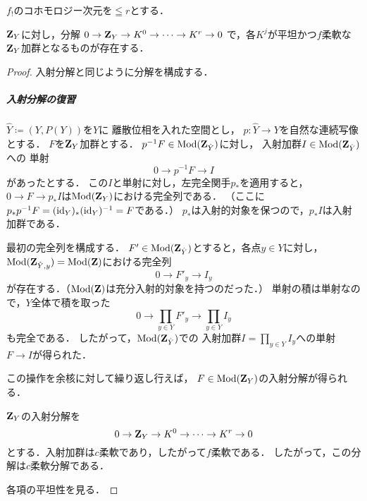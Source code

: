 \(f_!\)のコホモロジー次元を\(\leqq r\)とする．

\begin{LMM}
    \(\mathbf{Z}_Y\)に対し，分解
    \(0\to \mathbf{Z}_Y\to K^0\to\dots\to K^r\to0\)
    で，各\(K^j\)が平坦かつ\(f\)柔軟な\(\mathbf{Z}_Y\)加群となるものが存在する．
\end{LMM}
\begin{proof}
    入射分解と同じように分解を構成する．

    \subparagraph*{入射分解の復習}
    \(\hat{Y}\coloneqq\left(Y,P(Y)\right)\)を\(Y\)に
    離散位相を入れた空間とし，
    \(p\colon \hat{Y}\to Y\)を自然な連続写像とする．
    \(F\)を\(\mathbf{Z}_Y\)加群とする．
    \(p^{-1}F \in\mathop{\mathrm{Mod}}\nolimits(\mathbf{Z}_{\hat{Y}})\)に対し，
    入射加群\(I\in\mathop{\mathrm{Mod}}\nolimits(\mathbf{Z}_{\hat{Y}})\)への
    単射\[0\to p^{-1}F\to I\]があったとする．
    この\(I\)と単射に対し，左完全関手\(p_\ast\)を適用すると，
    \(0\to F\to p_\ast{I}\)は\(\mathop{\mathrm{Mod}}\nolimits(\mathbf{Z}_Y)\)における完全列である．
    （ここに\(p_\ast p^{-1}F=(\mathop{\mathrm{id}}\nolimits_Y)_\ast(\mathop{\mathrm{id}}\nolimits_Y)^{-1}=F\)である．）
    \(p_{\ast}\)は入射的対象を保つので，\(p_\ast{I}\)は入射加群である．

    最初の完全列を構成する．
    \(F'\in\mathop{\mathrm{Mod}}\nolimits(\mathbf{Z}_{\hat{Y}})\)とすると，各点\(y\in Y\)に対し，
    \(\mathop{\mathrm{Mod}}\nolimits(\mathbf{Z}_{\hat{Y},y})=\mathop{\mathrm{Mod}}\nolimits(\mathbf{Z})\)における完全列
    \[
        0\to F'_y\to I_y
    \]が存在する．（\(\mathop{\mathrm{Mod}}\nolimits(\mathbf{Z})\)は充分入射的対象を持つのだった．）
    単射の積は単射なので，\(Y\)全体で積を取った
    \[
        0\to \prod_{y\in Y}F'_y\to \prod_{y\in Y}I_y
    \]
    も完全である．
    したがって，\(\mathop{\mathrm{Mod}}\nolimits(\mathbf{Z}_{\hat{Y}})\)での
    入射加群\(I=\prod_{y\in Y}I_y\)への単射\(F\to I\)が得られた．

    この操作を余核に対して繰り返し行えば，
    \(F\in\mathop{\mathrm{Mod}}\nolimits(\mathbf{Z}_Y)\)の入射分解が得られる．
    
    {}

    \(\mathbf{Z}_Y\)の入射分解を
    \[
        0\to \mathbf{Z}_Y\to K^0\to\cdots\to K^r\to0
    \]
    とする．入射加群は\(c\)柔軟であり，したがって\(f\)柔軟である．
    したがって，この分解は\(c\)柔軟分解である．

    各項の平坦性を見る．
\end{proof}


